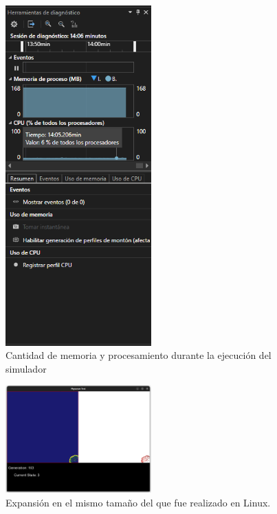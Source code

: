     \begin{figure}[htbp]
        \centering
        \includegraphics[width=0.5\textwidth]{./images/Pruebas/simulador/image080.png}
        \caption{Cantidad de memoria y procesamiento durante la ejecuci\'on del simulador}
        \label{fig:Ruta 80}
    \end{figure}
    \vskip 0.5cm
    \begin{figure}[htbp]
        \centering
        \includegraphics[width=0.5\textwidth]{./images/Pruebas/simulador/image081.png}
        \caption{Expansi\'on en el mismo tama\~no del que fue realizado en Linux.}
        \label{fig:Ruta 81}
    \end{figure}

